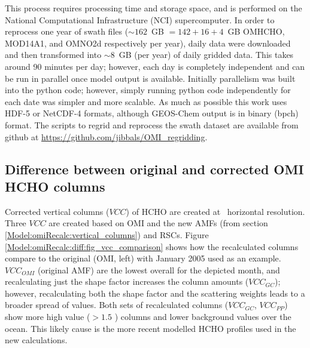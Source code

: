     This process requires processing time and storage space, and is performed on the National Computational Infrastructure (NCI) supercomputer.
    In order to reprocess one year of swath files ($\sim 162$~GB $ = 142 + 16 + 4$~GB OMHCHO, MOD14A1, and OMNO2d respectively per year), daily data were  downloaded and then transformed into $\sim 8$~GB (per year) of daily gridded data.
    This takes around 90 minutes per day; however, each day is completely independent and can be run in parallel once model output is available.
    Initially parallelism was built into the python code; however, simply running python code independently for each date was simpler and more scalable.
    As much as possible this work uses HDF-5 or NetCDF-4 formats, although GEOS-Chem output is in binary (bpch) format.
    The scripts to regrid and reprocess the swath dataset are available from github at \url{https://github.com/jibbals/OMI_regridding}.
  
  \subsection{Difference between original and corrected OMI HCHO columns}
  \label{Model:omiRecalc:diff}
    
    Corrected vertical columns ($VCC$) of HCHO are created at \highhr ~horizontal resolution.
    Three $VCC$ are created based on OMI and the new AMFs (from section \ref{Model:omiRecalc:vertical_columns}) and RSCs.
    Figure \ref{Model:omiRecalc:diff:fig_vcc_comparison} shows how the recalculated columns compare to the original (OMI, left) with January 2005 used as an example. 
    $VCC_{OMI}$ (original AMF) are the lowest overall for the depicted month, and recalculating just the shape factor increases the column amounts ($VCC_{GC}$); however, recalculating both the shape factor and the scattering weights leads to a broader spread of values.
    Both sets of recalculated columns ($VCC_{GC}$, $VCC_{PP}$) show more high value ($>1.5$ \moleccm) columns and lower background values over the ocean.
    This likely cause is the more recent modelled HCHO profiles used in the new calculations.
    
    
    
